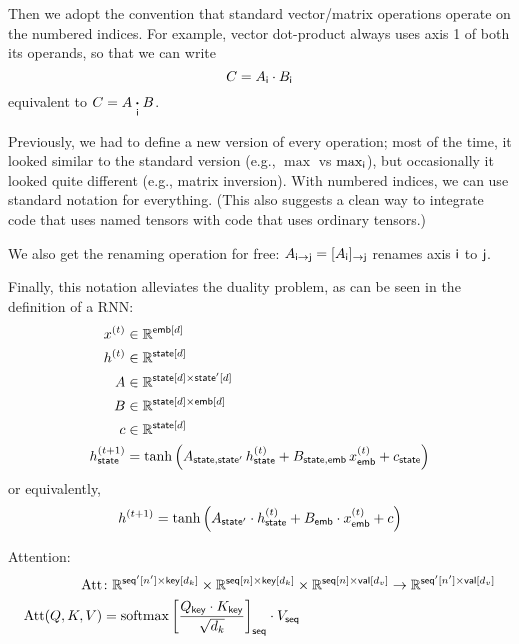 Then we adopt the convention that standard vector/matrix operations operate on the numbered indices. For example, vector dot-product always uses axis 1 of both its operands, so that we can write
\begin{equation*}
C = A_{\mathsf{i}} \cdot B_{\mathsf{i}}
\end{equation*}
equivalent to $C = A \mathbin{\mathop{\boldsymbol\cdot}\limits_{\mathsf{i}}} B$. 

Previously, we had to define a new version of every operation; most of the time, it looked similar to the standard version (e.g., $\max$ vs $\max_{\mathsf{i}}$), but occasionally it looked quite different (e.g., matrix inversion). With numbered indices, we can use standard notation for everything.
(This also suggests a clean way to integrate code that uses named tensors with code that uses ordinary tensors.)

We also get the renaming operation for free: $A_{\mathsf{i}\rightarrow\mathsf{j}} = [A_{\mathsf{i}}]_{\rightarrow\mathsf{j}}$ renames axis $\mathsf{i}$ to $\mathsf{j}$.

Finally, this notation alleviates the duality problem, as can be seen in the definition of a RNN:
\begin{align*}
x^{(t)} &\in \mathbb{R}^{\mathsf{emb}[d]} \\
h^{(t)} &\in \mathbb{R}^{\mathsf{state}[d]} \\
A &\in \mathbb{R}^{\mathsf{state}[d] \times \mathsf{state'}[d]} \\
B &\in \mathbb{R}^{\mathsf{state}[d] \times \mathsf{emb}[d]} \\
c &\in \mathbb{R}^{\mathsf{state}[d]} \\
h^{(t+1)}_{\mathsf{state}} &= \tanh\left( A_{\mathsf{state},\mathsf{state'}} \, h^{(t)}_{\mathsf{state}} + B_{\mathsf{state},\mathsf{emb}} \, x^{(t)}_{\mathsf{emb}} + c_{\mathsf{state}} \right)
\end{align*}
or equivalently,
\begin{equation*}
h^{(t+1)} = \tanh\left( A_{\mathsf{state'}} \cdot h^{(t)}_{\mathsf{state}} + B_{\mathsf{emb}} \cdot x^{(t)}_{\mathsf{emb}} + c \right)
\end{equation*}

Attention:
\begin{align*}
  \text{Att} &\colon \mathbb{R}^{\mathsf{seq'}[n'] \times\mathsf{key}[d_k]} \times \mathbb{R}^{\mathsf{seq}[n] \times\mathsf{key}[d_k]} \times \mathbb{R}^{\mathsf{seq}[n] \times\mathsf{val}[d_v]} \rightarrow \mathbb{R}^{\mathsf{seq'}[n'] \times\mathsf{val}[d_v]} \\
  \text{Att}(Q,K,V) &= \operatorname*{softmax} \left[ \frac{Q_{\mathsf{key}} \cdot K_{\mathsf{key}}}{\sqrt{d_k}} \right]_{\mathsf{seq}} \cdot V_{\mathsf{seq}}
\end{align*}

